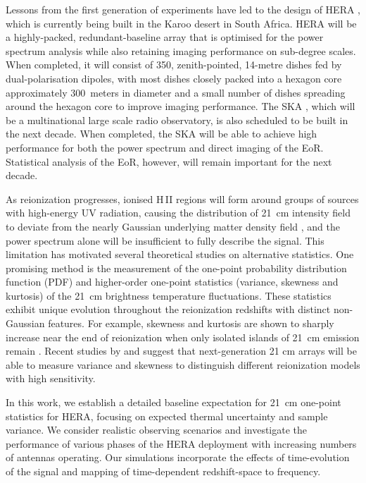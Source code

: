 \documentclass[fleqn,usenatbib]{mnras}
\begin{document}
Lessons from the first generation of experiments have led to the design of HERA \citep[Hydrogen Epoch of Reionization Array;][]{2017PASP..129d5001D}, which is currently being built in the Karoo desert in South Africa. HERA will be a highly-packed, redundant-baseline array that is optimised for the power spectrum analysis while also retaining imaging performance on sub-degree scales. When completed, it will consist of 350, zenith-pointed, 14-metre dishes fed by dual-polarisation dipoles, with most dishes closely packed into a hexagon core approximately 300~meters in diameter and a small number of dishes spreading around the hexagon core to improve imaging performance. The SKA \citep[Square Kilometre Array;][]{2013ExA....36..235M}, which will be a multinational large scale radio observatory, is also scheduled to be built in the next decade. When completed, the SKA will be able to achieve high performance for both the power spectrum and direct imaging of the EoR. Statistical analysis of the EoR, however, will remain important for the next decade. 

As reionization progresses, ionised H\,{\scriptsize II} regions will form around groups of sources with high-energy UV radiation, causing the distribution of 21~cm intensity field to deviate from the nearly Gaussian underlying matter density field \citep{2006MNRAS.372..679M,2007ApJ...659..865L}, and the power spectrum alone will be insufficient to fully describe the signal. This limitation has motivated several theoretical studies on alternative statistics. One promising method is the measurement of the one-point probability distribution function (PDF) and higher-order one-point statistics (variance, skewness and kurtosis) of the 21~cm brightness temperature fluctuations. These statistics exhibit unique evolution throughout the reionization redshifts with distinct non-Gaussian features. For example, skewness and kurtosis are shown to sharply increase near the end of reionization when only isolated islands of 21~cm emission remain \citep{2007MNRAS.379.1647W,2009MNRAS.393.1449H,Shimabukuro:2015cpa,2016MNRAS.456.3011D}. Recent studies by \citet{Watkinson:2014jv,Watkinson:2015ce} and \citet{2015MNRAS.449.3202W} suggest that next-generation 21 cm arrays will be able to measure variance and skewness to distinguish different reionization models with high sensitivity.

In this work, we establish a detailed baseline expectation for 21~cm one-point statistics for HERA, focusing on expected thermal uncertainty and sample variance.  We consider realistic observing scenarios and investigate the performance of various phases of the HERA deployment with increasing numbers of antennas operating.  Our simulations  incorporate the effects of time-evolution of the signal and mapping of time-dependent redshift-space to frequency.
\end{document}
